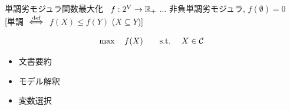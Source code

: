 \documentclass[14pt,aspectratio=169,xcolor=dvipsnames,table,onlytextwidth,dvipdfmx]{beamer}
\begin{document}
\begin{frame}{単調劣モジュラ関数最大化~\cite{Nemhauser1978}}
    $f : 2^V \to \mathbb{R}_+$ ... 非負\alert{単調}劣モジュラ, {\footnotesize $f(\emptyset)=0$} \\
    \hfill {\small [単調 $\overset{\text{def}}{\iff}$ $f(X) \leq f(Y)$ \quad ($X \subseteq Y$)]}

   \vfill
   \begin{block}{}
        \setlength{\abovedisplayskip}{0pt}
        \begin{align*}
            \max\quad f(X) \qquad \text{s.t.} \quad \tikz[remember picture, baseline=(const.base)]{\node(const){$X \in \mathcal{C}$};}
        \end{align*}
    \end{block}
    \pause

    \begin{overprint}
        \begin{itemize}
            \item 文書要約 \cite{Lin2011}
            \item モデル解釈~\cite{Ribeiro2016}
            \item 変数選択~\cite{Das2011,Elenberg2018}
        \end{itemize}
\end{overprint}
\end{frame}
\end{document}
